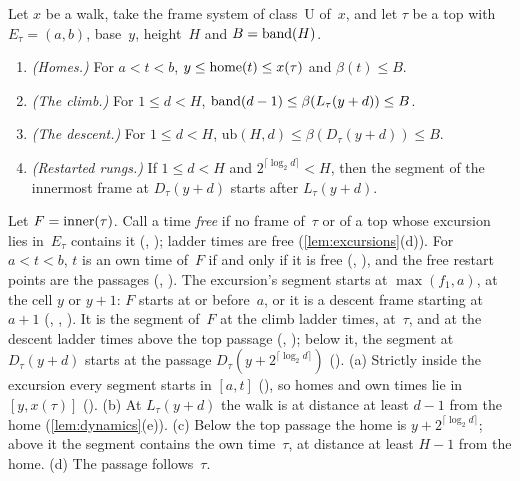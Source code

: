 \begin{lemma}\label{lem:ladderbands}
Let $x$ be a walk, take the frame system of class~U of~$x$, and let $\tau$ be a top with $E_\tau=(a,b)$, base~$y$, height~$H$
and $B=\operatorname{band}(H)$.
\begin{enumerate}[label=(\alph*)]
\item \emph{(Homes.)} For $a<t<b$, $y\le\operatorname{home}(t)\le x(\tau)$ and $\beta(t)\le B$.
\item \emph{(The climb.)} For $1\le d<H$, $\operatorname{band}(d-1)\le\beta(L_\tau(y+d))\le B$.
\item \emph{(The descent.)} For $1\le d<H$, $\mathrm{ub}(H,d)\le\beta(D_\tau(y+d))\le B$.
\item \emph{(Restarted rungs.)} If $1\le d<H$ and $2^{\lceil\log_2d\rceil}<H$, then the segment of the innermost frame at
$D_\tau(y+d)$ starts after $L_\tau(y+d)$.
\end{enumerate}
\end{lemma}

\begin{outline}
Let $F=\operatorname{inner}(\tau)$. Call a time \emph{free} if no frame of~$\tau$ or of a top whose excursion lies in~$E_\tau$ contains it
(, ); ladder times are free (\cref{lem:excursions}(d)). For $a<t<b$, $t$ is an own time of~$F$ if
and only if it is free (, ), and the free restart points are the passages
(, ). The excursion's segment starts at $\max(f_1,a)$, at the cell $y$ or $y+1$: $F$
starts at or before~$a$, or it is a descent frame starting at $a+1$ (, ,
). It is the segment of~$F$ at the climb ladder times, at~$\tau$, and at the descent ladder times above the top
passage (, ); below it, the segment at $D_\tau(y+d)$ starts at the passage
$D_\tau(y+2^{\lceil\log_2d\rceil})$ (). (a) Strictly inside the excursion every segment starts in $[a,t]$
(), so homes and own times lie in $[y,x(\tau)]$ (). (b) At $L_\tau(y+d)$ the
walk is at distance at least $d-1$ from the home (\cref{lem:dynamics}(e)). (c) Below the top passage the home is
$y+2^{\lceil\log_2d\rceil}$; above it the segment contains the own time~$\tau$, at distance at least $H-1$ from the home.
(d) The passage follows~$\tau$.
\end{outline}

